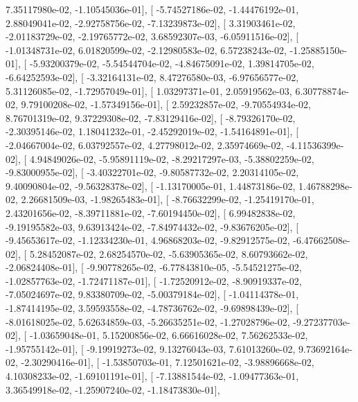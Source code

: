 \documentclass{article}
\begin{document}
          7.35117980e-02,  -1.10545036e-01],
       [ -5.74527186e-02,  -1.44476192e-01,   2.88049041e-02,
         -2.92758756e-02,  -7.13239873e-02],
       [  3.31903461e-02,  -2.01183729e-02,  -2.19765772e-02,
          3.68592307e-03,  -6.05911516e-02],
       [ -1.01348731e-02,   6.01820599e-02,  -2.12980583e-02,
          6.57238243e-02,  -1.25885150e-01],
       [ -5.93200379e-02,  -5.54544704e-02,  -4.84675091e-02,
          1.39814705e-02,  -6.64252593e-02],
       [ -3.32164131e-02,   8.47276580e-03,  -6.97656577e-02,
          5.31126085e-02,  -1.72957049e-01],
       [  1.03297371e-01,   2.05919562e-03,   6.30778874e-02,
          9.79100208e-02,  -1.57349156e-01],
       [  2.59232857e-02,  -9.70554934e-02,   8.76701319e-02,
          9.37229308e-02,  -7.83129416e-02],
       [ -8.79326170e-02,  -2.30395146e-02,   1.18041232e-01,
         -2.45292019e-02,  -1.54164891e-01],
       [ -2.04667004e-02,   6.03792557e-02,   4.27798012e-02,
          2.35974669e-02,  -4.11536399e-02],
       [  4.94849026e-02,  -5.95891119e-02,  -8.29217297e-03,
         -5.38802259e-02,  -9.83000955e-02],
       [ -3.40322701e-02,  -9.80587732e-02,   2.20314105e-02,
          9.40090804e-02,  -9.56328378e-02],
       [ -1.13170005e-01,   1.44873186e-02,   1.46788298e-02,
          2.26681509e-03,  -1.98265483e-01],
       [ -8.76632299e-02,  -1.25419170e-01,   2.43201656e-02,
         -8.39711881e-02,  -7.60194450e-02],
       [  6.99482838e-02,  -9.19195582e-03,   9.63913424e-02,
         -7.84974432e-02,  -9.83676205e-02],
       [ -9.45653617e-02,  -1.12334230e-01,   4.96868203e-02,
         -9.82912575e-02,  -6.47662508e-02],
       [  5.28452087e-02,   2.68254570e-02,  -5.63905365e-02,
          8.60793662e-02,  -2.06824408e-01],
       [ -9.90778265e-02,  -6.77843810e-05,  -5.54521275e-02,
         -1.02857763e-02,  -1.72471187e-01],
       [ -1.72520912e-02,  -8.90919337e-02,  -7.05024697e-02,
          9.83380709e-02,  -5.00379184e-02],
       [ -1.04114378e-01,  -1.87414195e-02,   3.59593558e-02,
         -4.78736762e-02,  -9.69898439e-02],
       [ -8.01618025e-02,   5.62634859e-03,  -5.26635251e-02,
         -1.27028796e-02,  -9.27237703e-02],
       [ -1.03659048e-01,   5.15200856e-02,   6.66616028e-02,
          7.56262533e-02,  -1.95755142e-01],
       [ -9.19919273e-02,   9.13276043e-03,   7.61013260e-02,
          9.73692164e-02,  -2.30290416e-01],
       [ -1.53850703e-01,   7.12501621e-02,  -3.98896668e-02,
          4.10308233e-02,  -1.69101191e-01],
       [ -7.13881544e-02,  -1.09477363e-01,   3.36549918e-02,
         -1.25907240e-02,  -1.18473830e-01],
\end{document}
